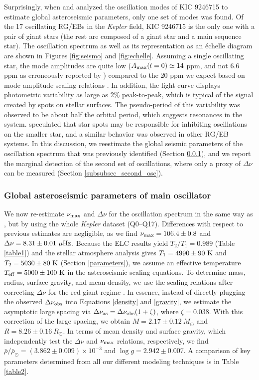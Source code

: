 Surprisingly, when \citet{gau13} and \citet{gau14} analyzed the oscillation modes of KIC 9246715 to estimate global asteroseismic parameters, only one set of modes was found. Of the 17 oscillating RG/EBs in the \emph{Kepler} field, KIC 9246715 is the only one with a pair of giant stars (the rest are composed of a giant star and a main sequence star). The oscillation spectrum as well as its representation as an \'echelle diagram are shown in Figures \ref{fig:seismo} and \ref{fig:echelle}. Assuming a single oscillating star, the mode amplitudes are quite low ($A_{\rm{max}}(l=0) \simeq 14$ ppm, and not 6.6 ppm as erroneously reported by \citealt{gau14}) compared to the 20 ppm we expect based on mode amplitude scaling relations \citep{cor13}. In addition, the light curve displays photometric variability as large as 2\% peak-to-peak, which is typical of the signal created by spots on stellar surfaces. The pseudo-period of this variability was observed to be about half the orbital period, which suggests resonances in the system. \citet{gau14} speculated that star spots may be responsible for inhibiting oscillations on the smaller star, and a similar behavior was observed in other RG/EB systems. In this discussion, we reestimate the global seismic parameters of the oscillation spectrum that was previously identified (Section \ref{subsubsec_main_osc}), and we report the marginal detection of the second set of oscillations, where only a proxy of $\Delta\nu$ can be measured (Section \ref{subsubsec_second_osc}).

\subsubsection{Global asteroseismic parameters of main oscillator}
\label{subsubsec_main_osc}
We now re-estimate $\nu_{\rm{max}}$ and $\Delta \nu$ for the oscillation spectrum in the same way as \citet{gau14}, but by using the whole \textit{Kepler} dataset (Q0--Q17). Differences with respect to previous estimates are negligible, as we find $\nu_{\rm{max}} = 106.4 \pm 0.8$ and $\Delta \nu = 8.31 \pm 0.01 \ \mu \rm{Hz}$. Because the ELC results yield $T_2/T_1=0.989$ (Table \ref{table1}) and the stellar atmosphere analysis gives $T_1 = 4990 \pm 90 \ \rm{K}$ and $T_2 = 5030 \pm 80 \ \rm{K}$ (Section \ref{parameters}), we assume an effective temperature $T_{\rm{eff}} = 5000 \pm 100 \ \rm{K}$ in the asteroseismic scaling equations. To determine mass, radius, surface gravity, and mean density, we use the scaling relations after correcting $\Delta \nu$ for the red giant regime \citep{mos13}. In essence, instead of directly plugging the observed $\Delta \nu_{\rm{obs}}$ into Equations \ref{density} and \ref{gravity}, we estimate the asymptotic large spacing via $\Delta \nu_{\rm{as}} = \Delta \nu_{\rm{obs}} (1 + \zeta)$, where $\zeta = 0.038$. With this correction of the large spacing, we obtain $M = 2.17 \pm 0.12 \ M_{\odot}$ and $R = 8.26 \pm 0.16 \ R_{\odot}$. In terms of mean density and surface gravity, which independently test the $\Delta \nu$  and $\nu_{\rm{max}}$ relations, respectively, we find $\bar{\rho}/\bar{\rho}_{\odot} = (3.862 \pm 0.009) \times 10 ^{-3}$ and $\log g = 2.942 \pm 0.007$. A comparison of key parameters determined from all our different modeling techniques is in Table \ref{table2}.

